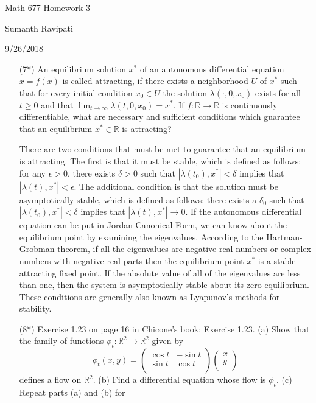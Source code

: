 \documentclass[12pt,letterpaper,reqno]{amsart}
\newcommand{\R}{\mathbb R}
\begin{document}
\thispagestyle{empty}
\centerline{\Large Math 677 Homework 3}
\centerline{Sumanth Ravipati}
\centerline{9/26/2018}
\vspace{.25in}

\begin{enumerate}
\item[(7*)] An equilibrium solution $x^*$ of an autonomous differential equation $\dot{x} = f(x)$ is called attracting, if there exists a neighborhood $U$ of $x^*$ such that for every initial condition $x_0 \in U$ the solution $\lambda(\cdot, 0, x_0)$ exists for all $t \geq 0$ and that $\lim_{t\rightarrow\infty}\lambda(t,0,x_0) = x^*$. \newline
If $f: \R\rightarrow\R$ is continuously differentiable, what are necessary and sufficient conditions which guarantee that an equilibrium $x^* \in \R$ is attracting?\newline
\begin{flushleft}
There are two conditions that must be met to guarantee that an equilibrium is attracting. The first is that it must be stable, which is defined as follows: for any $\epsilon > 0$, there exists $\delta > 0$ such that $|\lambda(t_0),x^*| < \delta$ implies that $|\lambda(t),x^*| < \epsilon$. The additional condition is that the solution must be asymptotically stable, which is defined as follows: there exists a $\delta_0$ such that $|\lambda(t_0),x^*| < \delta$ implies that $|\lambda(t),x^*| \rightarrow 0$. If the autonomous differential equation can be put in Jordan Canonical Form, we can know about the equilibrium point by examining the eigenvalues. According to the Hartman-Grobman theorem, if all the eigenvalues are negative real numbers or complex numbers with negative real parts then the equilibrium point $x^*$ is a stable attracting fixed point. If the absolute value of all of the eigenvalues are less than one, then the system is asymptotically stable about its zero equilibrium. These conditions are generally also known as Lyapunov's methods for stability.
\end{flushleft}
\newpage
\item[(8*)] Exercise 1.23 on page 16 in Chicone's book: \newline\newline
Exercise 1.23. (a) Show that the family of functions $\phi_t: \R^2\rightarrow\R^2$ given by
$$\phi_t(x,y) =
\begin{pmatrix}
  \cos{t} & -\sin{t} \\
  \sin{t} & \cos{t} \\
\end{pmatrix}
\begin{pmatrix}
  x \\
  y \\
\end{pmatrix}$$
defines a flow on $\R^2$. (b) Find a differential equation whose flow is $\phi_t$. (c) Repeat parts (a) and (b) for


\end{enumerate}
\end{document}
